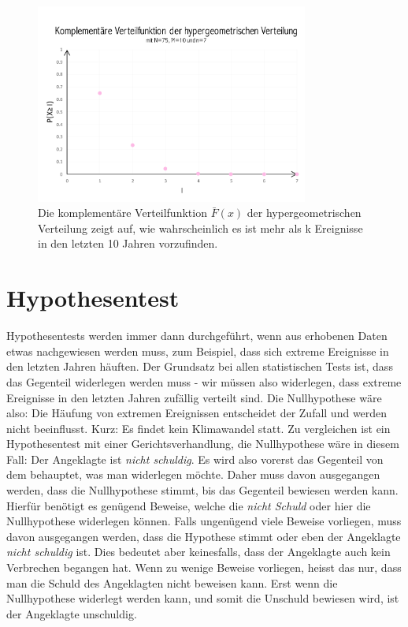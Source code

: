 \begin{refsection}
\begin{figure}
\centering
\includegraphics[width=0.8\textwidth]{extrem/HyperExt.pdf}
\caption{Die komplementäre Verteilfunktion $\bar{F}(x)$ der hypergeometrischen Verteilung zeigt auf, wie wahrscheinlich es ist mehr als k Ereignisse in den letzten 10 Jahren vorzufinden.}
\label{HyperExt}
\end{figure}

\section{Hypothesentest}
Hypothesentests werden immer dann durchgeführt, wenn aus erhobenen Daten etwas nachgewiesen werden muss, zum Beispiel, dass sich extreme Ereignisse in den letzten Jahren häuften. Der Grundsatz bei allen statistischen Tests ist, dass das Gegenteil widerlegen werden muss - wir müssen also widerlegen, dass extreme Ereignisse in den letzten Jahren zufällig verteilt sind. Die Nullhypothese wäre also: Die Häufung von extremen Ereignissen entscheidet der Zufall und werden nicht beeinflusst. Kurz: Es findet kein Klimawandel statt.
Zu vergleichen ist ein Hypothesentest mit einer Gerichtsverhandlung, die Nullhypothese wäre in diesem Fall: Der Angeklagte ist \textit{nicht schuldig}. Es wird also vorerst das Gegenteil von dem behauptet, was man widerlegen möchte. Daher muss davon ausgegangen werden, dass die Nullhypothese stimmt, bis das Gegenteil bewiesen werden kann. Hierfür benötigt es genügend Beweise, welche die \textit{nicht Schuld} oder hier die Nullhypothese widerlegen können.
Falls ungenügend viele Beweise vorliegen, muss davon ausgegangen werden, dass die Hypothese stimmt oder eben der Angeklagte \textit{nicht schuldig} ist. Dies bedeutet aber keinesfalls, dass der Angeklagte auch kein Verbrechen begangen hat. Wenn zu wenige Beweise vorliegen, heisst das nur, dass man die Schuld des Angeklagten nicht beweisen kann. Erst wenn die Nullhypothese widerlegt werden kann, und somit die Unschuld bewiesen wird, ist der Angeklagte unschuldig.



\end{refsection}
